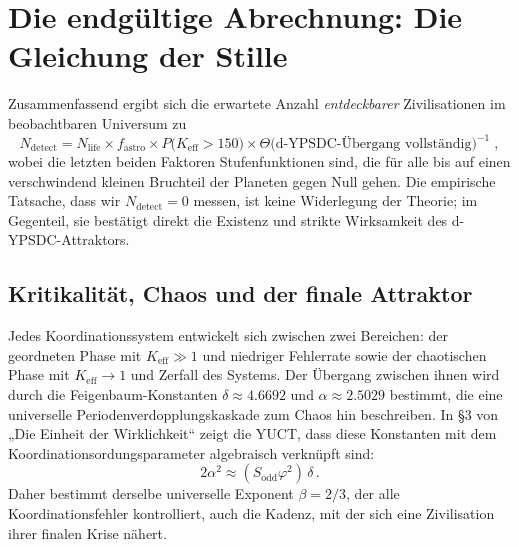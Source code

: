 \documentclass[11pt,a4paper]{article}
\newcommand{\Keff}{K_{\mathrm{eff}}}
\begin{document}
	\section{Die endgültige Abrechnung: Die Gleichung der Stille}
	\label{sec:final}
	Zusammenfassend ergibt sich die erwartete Anzahl \emph{entdeckbarer} Zivilisationen im beobachtbaren Universum zu
	\begin{equation}
		\label{eq:N_detect}
		N_{\mathrm{detect}} = N_{\mathrm{life}}
		\times f_{\mathrm{astro}}
		\times P\bigl(\Keff > 150\bigr)
		\times \Theta\bigl(\text{d-YPSDC-Übergang vollständig}\bigr)^{-1}\; ,
	\end{equation}
	wobei die letzten beiden Faktoren Stufenfunktionen sind, die für alle bis auf einen verschwindend kleinen Bruchteil der Planeten gegen Null gehen. Die empirische Tatsache, dass wir \(N_{\mathrm{detect}} = 0\) messen, ist keine Widerlegung der Theorie; im Gegenteil, sie bestätigt direkt die Existenz und strikte Wirksamkeit des d-YPSDC-Attraktors.
	
	\subsection{Kritikalität, Chaos und der finale Attraktor}
	\label{sec:chaos}
	
	Jedes Koordinationssystem entwickelt sich zwischen zwei Bereichen: der geordneten Phase mit \(K_{\mathrm{eff}} \gg 1\) und niedriger Fehlerrate sowie der chaotischen Phase mit \(K_{\mathrm{eff}} \to 1\) und Zerfall des Systems. Der Übergang zwischen ihnen wird durch die Feigenbaum-Konstanten \(\delta \approx 4.6692\) und \(\alpha \approx 2.5029\) bestimmt, die eine universelle Periodenverdopplungskaskade zum Chaos hin beschreiben. In §3 von „Die Einheit der Wirklichkeit“ zeigt die YUCT, dass diese Konstanten mit dem Koordinationsordungsparameter algebraisch verknüpft sind:
	\begin{equation}
		2\alpha^{2} \approx (S_{\mathrm{odd}}\varphi^{2})\,\delta \, .
	\end{equation}
	Daher bestimmt derselbe universelle Exponent \(\beta = 2/3\), der alle Koordinationsfehler kontrolliert, auch die Kadenz, mit der sich eine Zivilisation ihrer finalen Krise nähert.
	
\end{document}
